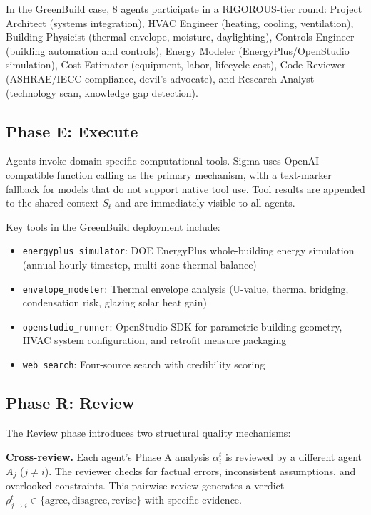 \documentclass[11pt,a4paper]{article}
\begin{document}
In the GreenBuild case, 8 agents participate in a RIGOROUS-tier round: Project Architect (systems integration), HVAC Engineer (heating, cooling, ventilation), Building Physicist (thermal envelope, moisture, daylighting), Controls Engineer (building automation and controls), Energy Modeler (EnergyPlus/OpenStudio simulation), Cost Estimator (equipment, labor, lifecycle cost), Code Reviewer (ASHRAE/IECC compliance, devil's advocate), and Research Analyst (technology scan, knowledge gap detection).

\subsection{Phase E: Execute}

Agents invoke domain-specific computational tools. Sigma uses OpenAI-compatible function calling as the primary mechanism, with a text-marker fallback for models that do not support native tool use. Tool results are appended to the shared context $S_t$ and are immediately visible to all agents.

Key tools in the GreenBuild deployment include:
\begin{itemize}
    \item \texttt{energyplus\_simulator}: DOE EnergyPlus whole-building energy simulation (annual hourly timestep, multi-zone thermal balance)
    \item \texttt{envelope\_modeler}: Thermal envelope analysis (U-value, thermal bridging, condensation risk, glazing solar heat gain)
    \item \texttt{openstudio\_runner}: OpenStudio SDK for parametric building geometry, HVAC system configuration, and retrofit measure packaging
    \item \texttt{web\_search}: Four-source search with credibility scoring
\end{itemize}

\subsection{Phase R: Review}

The Review phase introduces two structural quality mechanisms:

\textbf{Cross-review.} Each agent's Phase A analysis $\alpha_i^t$ is reviewed by a different agent $A_j$ ($j \neq i$). The reviewer checks for factual errors, inconsistent assumptions, and overlooked constraints. This pairwise review generates a verdict $\rho_{j \rightarrow i}^t \in \{\text{agree}, \text{disagree}, \text{revise}\}$ with specific evidence.
\end{document}
